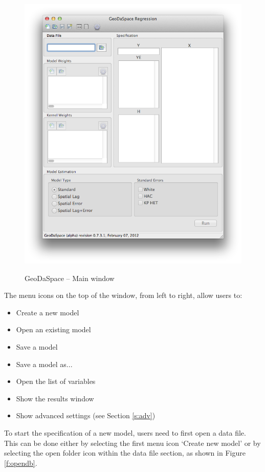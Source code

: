 \documentclass{article}
\begin{document}
\begin{figure}[htb]
\begin{center}
\includegraphics[width=0.8\linewidth]{GUI.png}\\
\caption{GeoDaSpace -- Main window}
\label{f:gui}
\end{center}
\end{figure}

\clearpage

The menu icons on the top of the window, from left to right, allow users to:
\begin{itemize}
\item Create a new model
\item Open an existing model
\item Save a model
\item Save a model as...
\item Open the list of variables
\item Show the results window
\item Show advanced settings (see Section \ref{s:adv})
\end{itemize}

To start the specification of a new model, users need to first open a data file. This can be done either by selecting the first menu icon `Create new model' or by selecting the open folder icon within the data file section, as shown in Figure \ref{f:opendb}.
\end{document}

